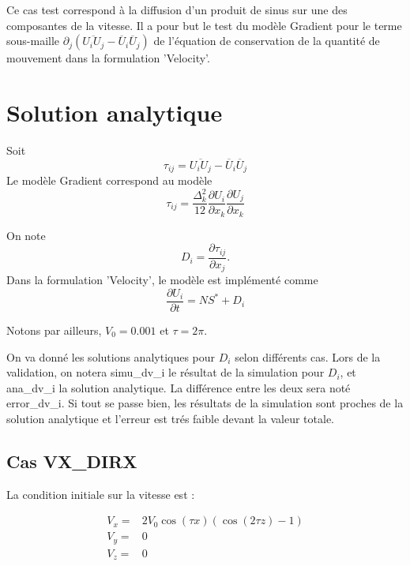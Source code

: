 Ce cas test correspond \`a la diffusion d'un produit de sinus sur une des composantes de la vitesse. Il a pour but le test du mod\`ele Gradient pour le terme sous-maille $\partial_j\left(\overline{U_i U_j} - \overline{U}_i\overline{U}_j\right)$ de l'\'equation de conservation de la quantit\'e de mouvement dans la formulation 'Velocity'.

\section{Solution analytique}

Soit
\begin{equation}
\tau_{ij} = \overline{U_i U_j} - \overline{U}_i\overline{U}_j
\end{equation}
Le mod\`ele Gradient correspond au mod\`ele
\begin{equation}
\tau_{ij} = \frac{\Delta_k^2}{12} \frac{\partial U_i}{\partial x_k} \frac{\partial U_j}{\partial x_k}
\end{equation}

On note
\begin{equation}
D_i = \frac{\partial \tau_{ij}}{\partial x_j}.
\end{equation}
Dans la formulation 'Velocity', le mod\`ele est impl\'ement\'e comme
\begin{equation}
\frac{\partial U_{i}}{\partial t} = NS^* + D_i
\end{equation}

Notons par ailleurs, $V_0 = 0.001$ et $\tau=2\pi$.

On va donn\'e les solutions analytiques pour $D_i$ selon diff\'erents cas.
Lors de la validation, on notera {\textsf simu\_dv\_i} le r\'esultat de la
simulation pour $D_i$, et {\textsf ana\_dv\_i} la solution analytique.
La diff\'erence entre les deux sera not\'e \textsf{error\_dv\_i}. Si tout se passe bien, les r\'esultats de la simulation sont proches de la solution analytique et l'erreur est tr\'es faible devant la valeur totale.



\subsection{Cas VX\_DIRX}

La condition initiale sur la vitesse est :

\begin{align*}
V_x ={}& 2 V_0 \cos(\tau x) (\cos(2 \tau z) - 1) \\
V_y ={}& 0 \\
V_z ={}& 0
\end{align*}

